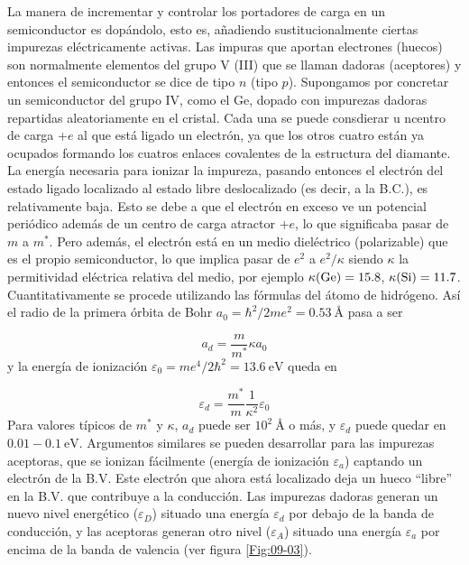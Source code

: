 La manera de incrementar y controlar los portadores de carga en un semiconductor es dopándolo, esto es, añadiendo sustitucionalmente ciertas impurezas eléctricamente activas. Las impuras que aportan electrones (huecos) son normalmente elementos del grupo V (III) que se llaman dadoras (aceptores) y entonces el semiconductor se dice de tipo $n$ (tipo $p$). Supongamos por concretar un semiconductor del grupo IV, como  el Ge, dopado con impurezas dadoras repartidas aleatoriamente en el cristal. Cada una se puede consdierar u ncentro de carga +$e$ al que está ligado un electrón, ya que los otros cuatro están ya ocupados formando los cuatros enlaces covalentes de la estructura del diamante. La energía necesaria para ionizar la impureza, pasando entonces el electrón del estado ligado localizado al estado libre deslocalizado (es decir, a la B.C.), es relativamente baja. Esto se debe a que el electrón en exceso ve un potencial periódico además de un centro de carga atractor $+e$, lo que significaba pasar de $m$ a $m^*$. Pero además, el electrón está en un medio dieléctrico (polarizable) que es el propio semiconductor, lo que implica pasar de $e^2$ a $e^2/\kappa$ siendo $\kappa$ la permitividad eléctrica relativa del medio, por ejemplo $\kappa(\ce{Ge})=15.8$, $\kappa(\ce{Si})=11.7$. Cuantitativamente se procede utilizando las fórmulas del átomo de hidrógeno. Así el radio de la primera órbita de Bohr $a_0=\hbar^2 / 2me^2=0.53 \ \unit{\angstrom}$ pasa a ser
 
\begin{equation}
	a_d = \frac{m}{m^*} \kappa a_0
\end{equation}
y la energía de ionización $\varepsilon_0=me^4/2\hbar^2=13.6 \ \unit{\eV}$ queda en

\begin{equation}
	\varepsilon_d = \frac{m^*}{m} \frac{1}{\kappa^2} \varepsilon_0
\end{equation}
Para valores típicos de $m^*$ y $\kappa$, $a_d$ puede ser $10^2 \ \unit{\angstrom}$ o más, y $\varepsilon_d$ puede quedar en $0.01-0.1 \ \unit{\eV}$. Argumentos similares se pueden desarrollar para las impurezas aceptoras, que se ionizan fácilmente (energía de ionización $\varepsilon_a$) captando un electrón de la B.V. Este electrón que ahora está localizado deja un hueco ``libre'' en la B.V. que contribuye a la conducción. Las impurezas dadoras generan un nuevo nivel  energético ($\varepsilon_D$) situado una energía $\varepsilon_d$ por debajo de la banda de conducción, y las aceptoras generan otro nivel ($\varepsilon_A$) situado una energía $\varepsilon_a$ por encima de la banda de valencia (ver figura \ref{Fig:09-03}).

